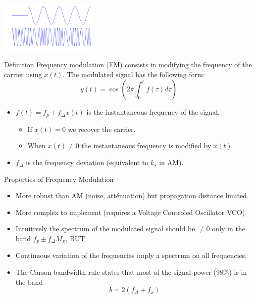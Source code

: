 \begin{center}
  \includegraphics[width=.8\linewidth,height=2.5cm]{imgs/fourier/illustration_mod_frq.pdf}
\end{center}
\vspace{-5mm}
    \begin{block}{Definition}
      Frequency modulation (FM) consists in modifying the frequency of the carrier using $x(t)$. 
      The modulated signal has the following form:
\begin{equation*}
  y(t)=\cos\left(2\pi  \int_0^tf(\tau)d\tau\right)
\end{equation*}
\vspace{-.5cm}
\begin{itemize}
\item $f(t)= f_p+  f_\Delta x(t)$ is the instantaneous frequency of the signal.
  \begin{itemize}
  \item If $x(t)=0$ we recover the carrier.
  \item When $x(t)\neq 0$ the instantaneous frequency is modified by $x(t)$
  \end{itemize}
\item $f_\Delta$ is the frequency deviation (equivalent to $k_s$ in
  AM).

\end{itemize}
    \end{block}

    \begin{block}{Properties of Frequency Modulation}
      \begin{itemize}
\item More robust than AM (noise, atténuation) but propagation distance limited.
\item More complex to implement (requires a Voltage Controled
Oscillator VCO).
\item Intuitively the spectrum of the modulated signal should be $\neq 0$
only in the band $f_p\pm f_\Delta M_x$, BUT
\item Continuous variation of the frequencies imply a spectrum on all frequencies.
\item The Carson bandwidth rule states that most of the signal power (98\%) is in the band 
\begin{equation*}
  b=2(f_\Delta+f_{x})
\end{equation*}
      \end{itemize}
    \end{block}

